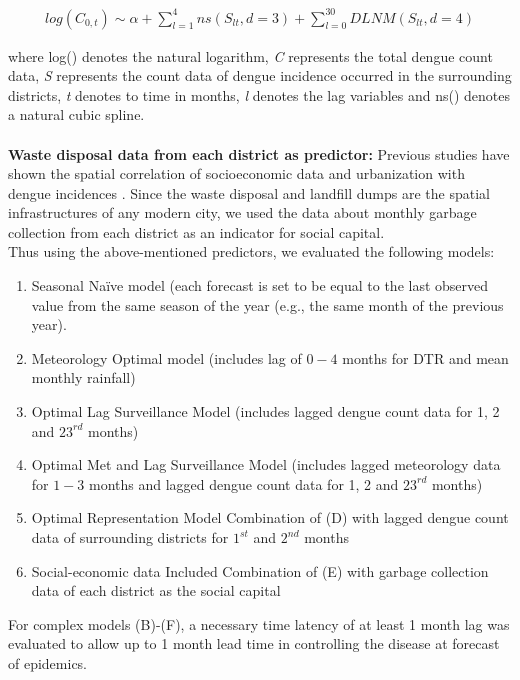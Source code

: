 \documentclass{bmcart}
\begin{document}
\begin{equation}
\begin{aligned}
\label{eq:surrounding}
log (C_{0,t}) \sim \alpha  +  \sum_{l=1}^{4} ns(S_ {lt}, d =3) + \sum_{l=0}^{30} DLNM(S_ {lt}, d = 4) 
\end{aligned}
\end{equation}


where log() denotes the natural logarithm, \textit{C} represents the total dengue count data, \textit{S} represents the count data of dengue incidence occurred in the surrounding districts, \textit{t} denotes to time in months, \textit{l} denotes the lag variables and ns() denotes a natural cubic spline. \\\\
\textbf{Waste disposal data from each district as predictor:} Previous studies have shown the spatial correlation of socioeconomic data and urbanization with dengue incidences \cite{mondini2008spatial,wu2009higher}. Since the waste disposal and landfill dumps are the spatial infrastructures of any modern city, we used the data about monthly garbage collection from each district as an indicator for social capital.\\ 

Thus using the above-mentioned predictors, we evaluated the following models: 
\begin{enumerate}[label=(\Alph*)]
	\item Seasonal Na\"{i}ve model (each forecast is set to be equal to the last observed value from the same season of the year (e.g., the same month of the previous year).
	\item Meteorology Optimal model (includes lag of $0-4$ months for DTR and mean monthly rainfall)
	\item Optimal Lag Surveillance Model (includes lagged dengue count data for 1, 2 and $23^{rd}$ months)
	\item Optimal Met and Lag Surveillance Model (includes lagged meteorology data for $1-3$ months and  lagged dengue count data for 1, 2 and $23^{rd}$ months)
	\item Optimal Representation Model Combination of (D) with lagged dengue count data of surrounding districts for $1^{st}$ and $2^{nd}$ months 
	\item Social-economic data Included Combination of (E) with garbage collection data of each district as the social capital
\end{enumerate}

For complex models (B)-(F), a necessary time latency of at least 1 month lag was evaluated to allow up to 1 month lead time in controlling the disease at forecast of epidemics.
\end{document}
